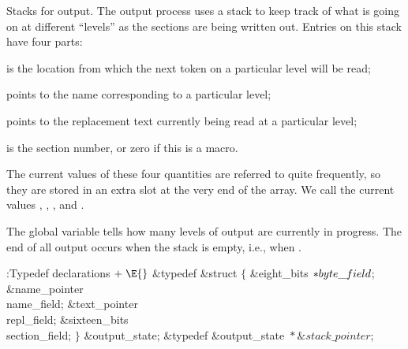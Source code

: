 Stacks for output.  The output process uses a stack to keep track
of what is going on at different ``levels'' as the sections are being
written out.  Entries on this stack have four parts:

\yskip\hang {} is the  location from which
the next
token on a particular level will be read;

\hang {} points to the name corresponding to a particular
level;

\hang {} points to the replacement text currently being read
at a particular level;

\hang {} is the section number, or zero if this is a
macro.

\yskip\noindent The current values of these four quantities are referred to
quite frequently, so they are stored in an extra slot at the very end of the
 array.  We call the current values , , ,
and .

The global variable  tells how many levels of output are
currently in progress. The end of all output occurs when the stack is
empty, i.e., when .

\Y\B\4:Typedef declarations\X${}\mathrel+\E{}$\6
\&{typedef} \&{struct} ${}\{{}$\1\6
\&{eight\_bits} ${}{*}\\{byte\_field}{}$;\6
\&{name\_pointer} \\{name\_field};\6
\&{text\_pointer} \\{repl\_field};\6
\&{sixteen\_bits} \\{section\_field};\2\6
${}\}{}$ \&{output\_state};\6
\&{typedef} \&{output\_state} ${}{*}\&{stack\_pointer}{}$;\par
\fi


